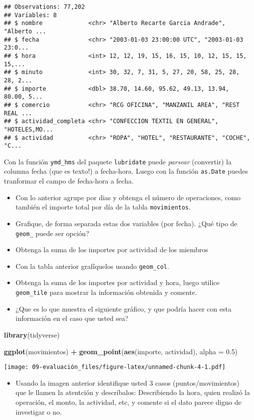 \documentclass[]{article}
\newenvironment{Shaded}{\begin{snugshade}}{\end{snugshade}}
\newcommand{\KeywordTok}[1]{\textcolor[rgb]{0.13,0.29,0.53}{\textbf{#1}}}
\newcommand{\DataTypeTok}[1]{\textcolor[rgb]{0.13,0.29,0.53}{#1}}
\newcommand{\FloatTok}[1]{\textcolor[rgb]{0.00,0.00,0.81}{#1}}
\newcommand{\StringTok}[1]{\textcolor[rgb]{0.31,0.60,0.02}{#1}}
\newcommand{\OperatorTok}[1]{\textcolor[rgb]{0.81,0.36,0.00}{\textbf{#1}}}
\newcommand{\NormalTok}[1]{#1}
\providecommand{\tightlist}{%
  \setlength{\itemsep}{0pt}\setlength{\parskip}{0pt}}
\begin{document}
\begin{verbatim}
## Observations: 77,202
## Variables: 8
## $ nombre             <chr> "Alberto Recarte Garcia Andrade", "Alberto ...
## $ fecha              <chr> "2003-01-03 23:00:00 UTC", "2003-01-03 23:0...
## $ hora               <int> 12, 12, 19, 15, 16, 15, 10, 12, 15, 15, 15,...
## $ minuto             <int> 30, 32, 7, 31, 5, 27, 20, 58, 25, 28, 28, 2...
## $ importe            <dbl> 38.70, 14.60, 95.62, 49.13, 13.94, 80.00, 5...
## $ comercio           <chr> "RCG OFICINA", "MANZANIL AREA", "REST REAL ...
## $ actividad_completa <chr> "CONFECCION TEXTIL EN GENERAL", "HOTELES,MO...
## $ actividad          <chr> "ROPA", "HOTEL", "RESTAURANTE", "COCHE", "C...
\end{verbatim}

Con la función \texttt{ymd\_hms} del paquete \texttt{lubridate} puede
\emph{parsear} (convertir) la columna fecha (que es texto!) a
fecha-hora. Luego con la función \texttt{as.Date} puedes tranformar el
campo de fecha-hora a fecha.

\begin{itemize}
\tightlist
\item
  Con lo anterior agrupe por dias y obtenga el número de operaciones,
  como también el importe total por día de la tabla
  \texttt{movimientos}.
\item
  Grafique, de forma separada estas dos variables (por fecha). ¿Qué tipo
  de \texttt{geom\_} puede ser opción?
\item
  Obtenga la suma de los importes por actividad de los miembros
\item
  Con la tabla anterior grafíquelos usando \texttt{geom\_col}.
\item
  Obtenga la suma de los importes por actividad y hora, luego utilice
  \texttt{geom\_tile} para mostrar la información obtenida y comente.
\item
  ¿Que es lo que muestra el siguiente gráfico, y que podría hacer con
  esta información en el caso que usted sea?
\end{itemize}

\begin{Shaded}
\begin{Highlighting}[]
\KeywordTok{library}\NormalTok{(tidyverse)}

\KeywordTok{ggplot}\NormalTok{(movimientos) }\OperatorTok{+}
\StringTok{  }\KeywordTok{geom_point}\NormalTok{(}\KeywordTok{aes}\NormalTok{(importe, actividad), }\DataTypeTok{alpha =} \FloatTok{0.5}\NormalTok{)}
\end{Highlighting}
\end{Shaded}

\texttt{[image: 09-evaluación\_files/figure-latex/unnamed-chunk-4-1.pdf]}

\begin{itemize}
\tightlist
\item
  Usando la imagen anterior identifique usted 3 casos
  (puntos/movimientos) que le llamen la atentción y descríbalos:
  Describiendo la hora, quien realizó la operación, el monto, la
  actividad, etc, y comente si el dato parece digno de investigar o no.
\end{itemize}
\end{document}
